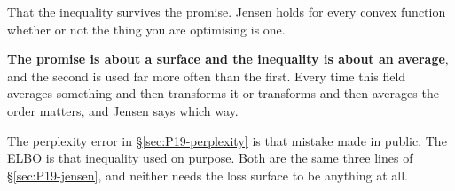 \begin{fr}
\begin{ansblock}
That the inequality survives the promise. Jensen holds for every convex
function whether or not the thing you are optimising is one.
\end{ansblock}

\textbf{The promise is about a surface and the inequality is about an
average}, and the second is used far more often than the first. Every time
this field averages something and then transforms it \dash{} or transforms
and then averages \dash{} the order matters, and Jensen says which way.

The perplexity error in \S\ref{sec:P19-perplexity} is that mistake made in
public. The ELBO is that inequality used on purpose. Both are the same three
lines of \S\ref{sec:P19-jensen}, and neither needs the loss surface to be
anything at all.
\end{fr}

